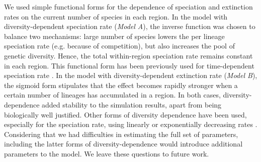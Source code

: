 We used simple functional forms for the dependence of speciation and extinction rates on the current number of species in each region. 
In the model with diversity-dependent speciation rate (\textit{Model A}), the inverse function was chosen to balance two mechanisms: large number of species lowers the per lineage speciation rate (e.g. because of competition), but also increases the pool of genetic diversity. 
Hence, the total within-region speciation rate remains constant in each region. 
This functional form has been previously used for time-dependent speciation rate \citep{Nee1994}. 
In the model with diversity-dependent extinction rate (\textit{Model B}), the sigmoid form stipulates that the effect becomes rapidly stronger when a certain number of lineages has accumulated in a region. 
In both cases, diversity-dependence added stability to the simulation results, apart from being biologically well justified.  
Other forms of diversity dependence have been used, especially for the speciation rate, using linearly or exponentially decreasing rates \citep{Rabosky2008, Etienne2012}. 
Considering that we had difficulties in estimating the full set of parameters, including the latter forms of diversity-dependence would introduce additional parameters to the model. 
We leave these questions to future work.
	 
